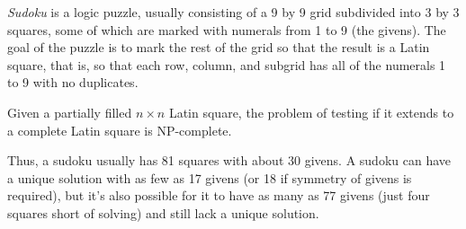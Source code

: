 \documentclass[12pt]{article}
\begin{document}
\emph{Sudoku} is a logic puzzle, usually consisting of a 9 by 9 grid subdivided into 3 by 3 squares, some of which are marked with numerals from 1 to 9 (the givens). The goal of the puzzle is to mark the rest of the grid so that the result is a Latin square, that is, so that each row, column, and subgrid has all of the numerals 1 to 9 with no duplicates. 

Given a partially filled $n \times n$ Latin square, the problem of testing if it extends to a complete Latin square is NP-complete.

Thus, a sudoku usually has 81 squares with about 30 givens. A sudoku can have a unique solution with as few as 17 givens (or 18 if symmetry of givens is required), but it's also possible for it to have as many as 77 givens (just four squares short of solving) and still lack a unique solution.
\end{document}
